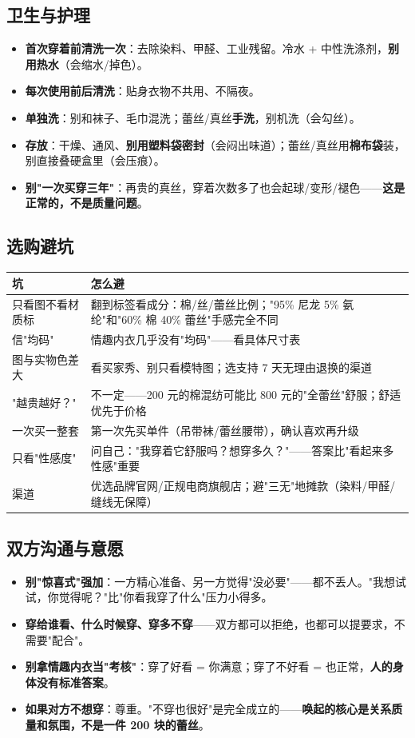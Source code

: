 \documentclass[12pt,UTF8,openany]{ctexbook}
\begin{document}
\subsection*{卫生与护理}
\begin{itemize}[leftmargin=2em,itemsep=0.3em]
  \item \textbf{首次穿着前清洗一次}：去除染料、甲醛、工业残留。冷水 + 中性洗涤剂，\textbf{别用热水}（会缩水/掉色）。
  \item \textbf{每次使用前后清洗}：贴身衣物不共用、不隔夜。
  \item \textbf{单独洗}：别和袜子、毛巾混洗；蕾丝/真丝\textbf{手洗}，别机洗（会勾丝）。
  \item \textbf{存放}：干燥、通风、\textbf{别用塑料袋密封}（会闷出味道）；蕾丝/真丝用\textbf{棉布袋}装，别直接叠硬盒里（会压痕）。
  \item \textbf{别"一次买穿三年"}：再贵的真丝，穿着次数多了也会起球/变形/褪色——\textbf{这是正常的，不是质量问题}。
\end{itemize}

\subsection*{选购避坑}
\begin{tabularx}{\textwidth}{X X}
\toprule
\textbf{坑} & \textbf{怎么避} \\
\midrule
只看图不看材质标 & 翻到标签看成分：棉/丝/蕾丝比例；"95\% 尼龙 5\% 氨纶"和"60\% 棉 40\% 蕾丝"手感完全不同 \\
信"均码" & 情趣内衣几乎没有"均码"——看具体尺寸表 \\
图与实物色差大 & 看买家秀、别只看模特图；选支持 7 天无理由退换的渠道 \\
"越贵越好？" & 不一定——200 元的棉混纺可能比 800 元的"全蕾丝"舒服；舒适优先于价格 \\
一次买一整套 & 第一次先买单件（吊带袜/蕾丝腰带），确认喜欢再升级 \\
只看"性感度" & 问自己："我穿着它舒服吗？想穿多久？"——答案比"看起来多性感"重要 \\
渠道 & 优选品牌官网/正规电商旗舰店；避"三无"地摊款（染料/甲醛/缝线无保障） \\
\bottomrule
\end{tabularx}

\subsection*{双方沟通与意愿}
\begin{itemize}[leftmargin=2em,itemsep=0.3em]
  \item \textbf{别"惊喜式"强加}：一方精心准备、另一方觉得"没必要"——都不丢人。"我想试试，你觉得呢？"比"你看我穿了什么"压力小得多。
  \item \textbf{穿给谁看、什么时候穿、穿多不穿}——双方都可以拒绝，也都可以提要求，不需要"配合"。
  \item \textbf{别拿情趣内衣当"考核"}：穿了好看 = 你满意；穿了不好看 = 也正常，\textbf{人的身体没有标准答案}。
  \item \textbf{如果对方不想穿}：尊重。"不穿也很好"是完全成立的——\textbf{唤起的核心是关系质量和氛围，不是一件 200 块的蕾丝}。
\end{itemize}
\end{document}
